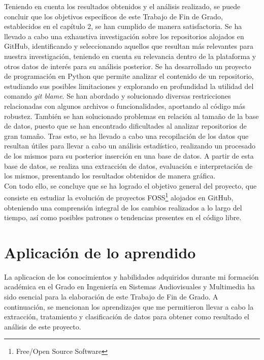 \documentclass[a4paper, 12pt]{book}
\begin{document}
Teniendo en cuenta los resultados obtenidos y el análisis realizado, se puede concluir que los objetivos específicos de este Trabajo de Fin de Grado, establecidos
en el capítulo 2, se han cumplido de manera satisfactoria. Se ha llevado a cabo una exhaustiva investigación sobre los repositorios alojados en GitHub, identificando
y seleccionando aquellos que resultan más relevantes para nuestra investigación, teniendo en cuenta su relevancia dentro de la plataforma y otros datos de interés para
su análisis posterior. Se ha desarrollado un proyecto de programación en Python que permite analizar el contenido de un repositorio, estudiando sus posibles limitaciones
y explorando en profundidad la utilidad del comando \textit{git blame}. Se han abordado y solucionado diversas restricciones relacionadas con algunos archivos o funcionalidades,
aportando al código más robustez. También se han solucionado problemas en relación al tamaño de la base de datos, puesto que se han encontrado dificultades al analizar 
repositorios de gran tamaño. Tras esto, se ha llevado a cabo una recopilación de los datos que resultan útiles para llevar a cabo un análisis estadístico, realizando un
procesado de los mismos para su posterior inserción en una base de datos. A partir de esta base de datos, se realiza una extracción de datos, evaluación e interpretación
de los mismos, presentando los resultados obtenidos de manera gráfica.
\\Con todo ello, se concluye que se ha logrado el objetivo general del proyecto, que consiste en estudiar la evolución de proyectos FOSS\footnote{Free/Open Source Software}
 alojados en GitHub, obteniendo una comprensión integral de los cambios realizados a lo largo del tiempo, así como posibles patrones o tendencias  presentes en el código libre.

\section{Aplicación de lo aprendido}
\label{sec:aplicacion}

La aplicacion de los conocimientos y habilidades adquiridos durante mi formación académica en el Grado en Ingeniería en Sistemas Audiovisuales y Multimedia ha sido esencial para
la elaboración de este Trabajo de Fin de Grado. A continuación, se mencionan los aprendizajes que me permitieron llevar a cabo la extracción, tratamiento y clasificación de datos
para obtener como resultado el análisis de este proyecto.
\end{document}
